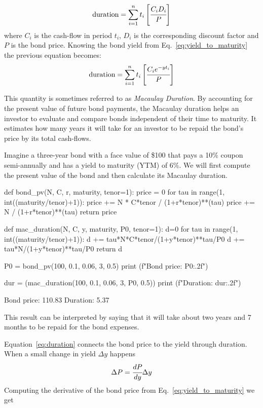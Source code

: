 \begin{equation}
\textrm{duration} = \sum_{i=1}^{n} t_i \left[\cfrac{C_i D_i}{P}\right] 
\end{equation}
where $C_i$ is the cash-flow in period $t_i$, $D_i$ is the corresponding discount factor and $P$ is the bond price.
Knowing the bond yield from Eq.~\ref{eq:yield_to_maturity} the previous equation becomes:
\begin{equation}
\textrm{duration} = \sum_{i=1}^{n} t_i \left[\cfrac{C_i e^{-yt_i}}{P}\right] 
\label{eq:duration}
\end{equation}

This quantity is sometimes referred to as \emph{Macaulay Duration}. By accounting for the present value of future bond payments, the Macaulay duration helps an investor to evaluate and compare bonds independent of their time to maturity.
It estimates how many years it will take for an investor to be repaid the bond’s price by its total cash-flows.

Imagine a three-year bond with a face value of \$100 that pays a 10\% coupon semi-annually and has a yield to maturity (YTM) of 6\%. We will first compute the present value of the bond and then calculate its Macaulay duration.

\begin{ipythonnon}
def bond_pv(N, C, r, maturity, tenor=1):
	price = 0
	for tau in range(1, int((maturity/tenor)+1)):
		price += N * C*tenor / (1+r*tenor)**(tau)
	price += N / (1+r*tenor)**(tau)
	return price

def mac_duration(N, C, y, maturity, P0, tenor=1): 
	d=0
	for tau in range(1, int((maturity/tenor)+1)):
		d += tau*N*C*tenor/(1+y*tenor)**tau/P0
	d += tau*N/(1+y*tenor)**tau/P0 
	return d

P0 = bond_pv(100, 0.1, 0.06, 3, 0.5)
print (f"Bond price: {P0:.2f}")

dur = (mac_duration(100, 0.1, 0.06, 3, P0, 0.5))
print (f"Duration: {dur:.2f}")
\end{ipythonnon}
\begin{ioutput}
Bond price: 110.83
Duration: 5.37
\end{ioutput}

This result can be interpreted by saying that it will take about two years and 7 months to be repaid for the bond expenses.

Equation~\ref{eq:duration} connects the bond price to the yield through duration. When a small change in yield $\Delta y$ happens
\begin{equation}
\Delta P = \cfrac{dP}{dy}\Delta y
\label{eq:price_1st_order}
\end{equation}
\noindent
Computing the derivative of the bond price from Eq.~\ref{eq:yield_to_maturity} we get

